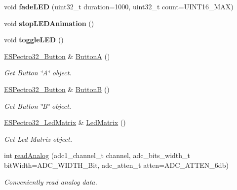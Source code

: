\begin{DoxyCompactItemize}
\item 
\hypertarget{classESPectro32__Board_a994b4f6b2d50e5cc19346f98f4eb3bcf}{void {\bfseries fade\-L\-E\-D} (uint32\-\_\-t duration=1000, uint32\-\_\-t count=U\-I\-N\-T16\-\_\-\-M\-A\-X)}\label{classESPectro32__Board_a994b4f6b2d50e5cc19346f98f4eb3bcf}

\item 
\hypertarget{classESPectro32__Board_a43e6b437ec48bb462b21ef4afaaf291f}{void {\bfseries stop\-L\-E\-D\-Animation} ()}\label{classESPectro32__Board_a43e6b437ec48bb462b21ef4afaaf291f}

\item 
\hypertarget{classESPectro32__Board_aa1c45b12c83d1c129705221dcafaac59}{void {\bfseries toggle\-L\-E\-D} ()}\label{classESPectro32__Board_aa1c45b12c83d1c129705221dcafaac59}

\item 
\hyperlink{classESPectro32__Button}{E\-S\-Pectro32\-\_\-\-Button} \& \hyperlink{classESPectro32__Board_a96ba6663e7268020a138b06bce4c8ad4}{Button\-A} ()
\begin{DoxyCompactList}\small\item\em Get Button \char`\"{}\-A\char`\"{} object. \end{DoxyCompactList}\item 
\hyperlink{classESPectro32__Button}{E\-S\-Pectro32\-\_\-\-Button} \& \hyperlink{classESPectro32__Board_ace0cadf53cdc876fc28ae83c90b0e162}{Button\-B} ()
\begin{DoxyCompactList}\small\item\em Get Button \char`\"{}\-B\char`\"{} object. \end{DoxyCompactList}\item 
\hyperlink{classESPectro32__LedMatrix}{E\-S\-Pectro32\-\_\-\-Led\-Matrix} \& \hyperlink{classESPectro32__Board_a167e14540f5b245968654cd4414065f0}{Led\-Matrix} ()
\begin{DoxyCompactList}\small\item\em Get Led Matrix object. \end{DoxyCompactList}\item 
int \hyperlink{classESPectro32__Board_ab3da57228e6f7daed9564414d9d5a28c}{read\-Analog} (adc1\-\_\-channel\-\_\-t channel, adc\-\_\-bits\-\_\-width\-\_\-t bit\-Width=A\-D\-C\-\_\-\-W\-I\-D\-T\-H\-\_\-Bit, adc\-\_\-atten\-\_\-t atten=A\-D\-C\-\_\-\-A\-T\-T\-E\-N\-\_\-6db)
\begin{DoxyCompactList}\small\item\em Conveniently read analog data. \end{DoxyCompactList}\item 

\end{DoxyCompactItemize}
